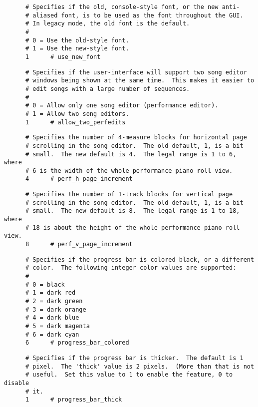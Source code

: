    \begin{verbatim}
      # Specifies if the old, console-style font, or the new anti-
      # aliased font, is to be used as the font throughout the GUI.
      # In legacy mode, the old font is the default.
      #
      # 0 = Use the old-style font.
      # 1 = Use the new-style font.
      1      # use_new_font
   \end{verbatim}

   \begin{verbatim}
      # Specifies if the user-interface will support two song editor
      # windows being shown at the same time.  This makes it easier to
      # edit songs with a large number of sequences.
      #
      # 0 = Allow only one song editor (performance editor).
      # 1 = Allow two song editors.
      1      # allow_two_perfedits
   \end{verbatim}

   \begin{verbatim}
      # Specifies the number of 4-measure blocks for horizontal page
      # scrolling in the song editor.  The old default, 1, is a bit
      # small.  The new default is 4.  The legal range is 1 to 6, where
      # 6 is the width of the whole performance piano roll view.
      4      # perf_h_page_increment
   \end{verbatim}

   \begin{verbatim}
      # Specifies the number of 1-track blocks for vertical page
      # scrolling in the song editor.  The old default, 1, is a bit
      # small.  The new default is 8.  The legal range is 1 to 18, where
      # 18 is about the height of the whole performance piano roll view.
      8      # perf_v_page_increment
   \end{verbatim}

   \begin{verbatim}
      # Specifies if the progress bar is colored black, or a different
      # color.  The following integer color values are supported:
      # 
      # 0 = black
      # 1 = dark red
      # 2 = dark green
      # 3 = dark orange
      # 4 = dark blue
      # 5 = dark magenta
      # 6 = dark cyan
      6      # progress_bar_colored
   \end{verbatim}

   \begin{verbatim}
      # Specifies if the progress bar is thicker.  The default is 1
      # pixel.  The 'thick' value is 2 pixels.  (More than that is not
      # useful.  Set this value to 1 to enable the feature, 0 to disable
      # it.
      1      # progress_bar_thick
   \end{verbatim}

